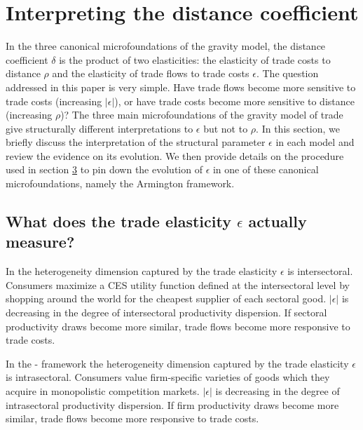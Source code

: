 \documentclass[12pt,twoside,a4paper,notitlepage]{article}
\begin{document}
\clearpage

\section{ Interpreting the distance coefficient}
In the three canonical microfoundations of the gravity model, the distance coefficient $\delta $ is the product of two elasticities: the elasticity of trade costs to distance $ \rho $ and the elasticity of trade flows to trade costs $ \epsilon $.
The question addressed in this paper is very simple.
Have trade flows become more sensitive to trade costs (increasing $ |\epsilon| $), or have trade costs become more sensitive to distance (increasing $\rho$)? 
The three main microfoundations of the gravity model of trade give structurally different interpretations to $ \epsilon $ but not to $ \rho $. 
In this section, we briefly discuss the interpretation of the structural parameter $ \epsilon $ in each model and review the evidence on its evolution. 
We then provide details on the procedure used in section {\hyperref[ref-003]{3}} to pin down the evolution of $ \epsilon $ in one of these canonical microfoundations, namely the Armington framework. 

\subsection{What does the trade elasticity $ \epsilon $ actually measure? }

In \cite{Eaton2002} the heterogeneity dimension captured by the trade elasticity $ \epsilon $ is intersectoral.
Consumers maximize a CES utility function defined at the intersectoral level by shopping around the world for the cheapest supplier of each sectoral good. 
$|\epsilon|$  is decreasing in the degree of intersectoral productivity dispersion.
If sectoral productivity draws become more similar, trade flows become more responsive to trade costs.

In the \cite{Melitz2003}-\cite{Chaney2008} framework the heterogeneity dimension captured by the trade elasticity $ \epsilon $ is intrasectoral.
Consumers value firm-specific varieties of goods which they acquire in monopolistic competition markets.
$ |\epsilon| $ is decreasing in the degree of intrasectoral productivity dispersion.
If firm productivity draws become more similar, trade flows become more responsive to trade costs.
\end{document}
